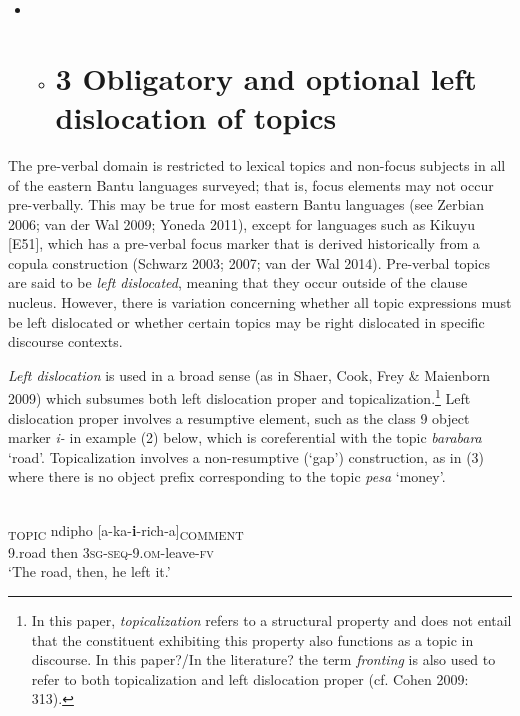\documentclass[output=paper]{langsci/langscibook}
\begin{document}
\begin{itemize}
\item \begin{itemize}
\item \section{3  Obligatory and optional left dislocation of topics}\end{itemize}
\end{itemize}

The pre-verbal domain is restricted to lexical topics and non-focus subjects in all of the eastern Bantu languages surveyed; that is, focus elements may not occur pre-verbally. This may be true for most eastern Bantu languages (see Zerbian 2006; van der Wal 2009; Yoneda 2011), except for languages such as Kikuyu [E51], which has a pre-verbal focus marker that is derived historically from a copula construction (Schwarz 2003; 2007; van der Wal 2014). Pre-verbal topics are said to be \textit{left dislocated}, meaning that they occur outside of the clause nucleus. However, there is variation concerning whether all topic expressions must be left dislocated or whether certain topics may be right dislocated in specific discourse contexts.

\textit{Left dislocation} is used in a broad sense (as in Shaer, Cook, Frey \& Maienborn 2009) which subsumes both left dislocation proper and topicalization.\footnote{In this paper, \textit{topicalizat}\textit{ion} refers to a structural property and does not entail that the constituent exhibiting this property also functions as a topic in discourse. In this paper?/In the literature? the term \textit{fronting} is also used to refer to both topicalization and left dislocation proper (cf. Cohen 2009: 313).} Left dislocation proper involves a resumptive element, such as the class 9 object marker \textit{i}\textit{\nobreakdash-} in example (2) below, which is coreferential with the topic \textit{barabara} ‘road’. Topicalization involves a non-resumptive (‘gap’) construction, as in (3) where there is no object prefix corresponding to the topic \textit{pesa} ‘money’.

\ea\label{ex:}
\\
\gll [Barabara]\textsubscript{TOPIC} ndipho [a-ka-\textbf{i}{}-rich-a]\textsubscript{COMMENT}\\
     9.road then \textsc{3sg-seq}{}-9.\textsc{om}{}-leave-\textsc{fv}\\
\glt \textup{‘}\textup{The road, then, he left it.’}
\z
\end{document}
